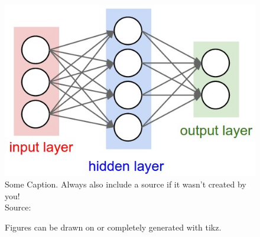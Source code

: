 \documentclass[
			   fontsize=11pt,
               paper=a4,
               bibliography=totoc,
               idxtotoc,
               headsepline,
               footsepline,
               footinclude=false,
               BCOR=12mm,
               DIV=13,
               openany,   %
               ]
               {scrbook}
\begin{document}
\begin{multicols}{2} %
	\begin{figure}[H] %
		\centering
		\includegraphics[width=.9\columnwidth]{figures/ann1.jpeg}
		\caption[Example Figure]{Some Caption. Always also include a source if it wasn't created by you!\\
			\tiny{Source:~\cite{annGraphics}}}
		\label{fig:exampleLabel1} %
	\end{figure}
	
	\columnbreak    %
	
	\begin{figure}[H]
		\centering
		\caption[Figure with tikz]{Figures can be drawn on or completely generated with tikz.}
		\label{fig:exampleLabel2}
	\end{figure}
\end{multicols}
\end{document}
